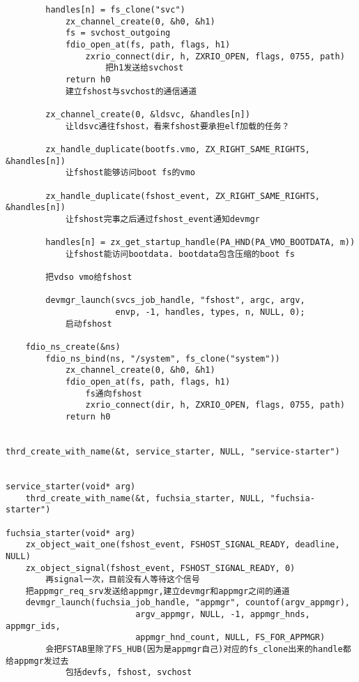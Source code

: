 \begin{verbatim}
        handles[n] = fs_clone("svc")
            zx_channel_create(0, &h0, &h1)
            fs = svchost_outgoing
            fdio_open_at(fs, path, flags, h1)
                zxrio_connect(dir, h, ZXRIO_OPEN, flags, 0755, path)
                    把h1发送给svchost
            return h0
            建立fshost与svchost的通信通道

        zx_channel_create(0, &ldsvc, &handles[n])
            让ldsvc通往fshost，看来fshost要承担elf加载的任务？

        zx_handle_duplicate(bootfs.vmo, ZX_RIGHT_SAME_RIGHTS, &handles[n])
            让fshost能够访问boot fs的vmo

        zx_handle_duplicate(fshost_event, ZX_RIGHT_SAME_RIGHTS, &handles[n])
            让fshost完事之后通过fshost_event通知devmgr

        handles[n] = zx_get_startup_handle(PA_HND(PA_VMO_BOOTDATA, m))
            让fshost能访问bootdata. bootdata包含压缩的boot fs
        
        把vdso vmo给fshost

        devmgr_launch(svcs_job_handle, "fshost", argc, argv,
                      envp, -1, handles, types, n, NULL, 0);
            启动fshost

    fdio_ns_create(&ns)
        fdio_ns_bind(ns, "/system", fs_clone("system"))
            zx_channel_create(0, &h0, &h1)
            fdio_open_at(fs, path, flags, h1)
                fs通向fshost
                zxrio_connect(dir, h, ZXRIO_OPEN, flags, 0755, path)
            return h0


thrd_create_with_name(&t, service_starter, NULL, "service-starter")


service_starter(void* arg)
    thrd_create_with_name(&t, fuchsia_starter, NULL, "fuchsia-starter")

fuchsia_starter(void* arg)
    zx_object_wait_one(fshost_event, FSHOST_SIGNAL_READY, deadline, NULL)
    zx_object_signal(fshost_event, FSHOST_SIGNAL_READY, 0)
        再signal一次，目前没有人等待这个信号
    把appmgr_req_srv发送给appmgr,建立devmgr和appmgr之间的通道
    devmgr_launch(fuchsia_job_handle, "appmgr", countof(argv_appmgr),
                          argv_appmgr, NULL, -1, appmgr_hnds, appmgr_ids,
                          appmgr_hnd_count, NULL, FS_FOR_APPMGR)
        会把FSTAB里除了FS_HUB(因为是appmgr自己)对应的fs_clone出来的handle都给appmgr发过去
            包括devfs, fshost, svchost

    

\end{verbatim}


